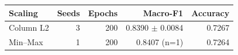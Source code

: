 \begin{tabular}{lrrrr}
\toprule
Scaling & Seeds & Epochs & Macro-F1 & Accuracy \\
\midrule
Column L2 & 3 & 200 & 0.8390 $\pm$ 0.0084 & 0.7267 \\
Min--Max & 1 & 200 & 0.8407 (n=1) & 0.7264 \\
\bottomrule
\end{tabular}
